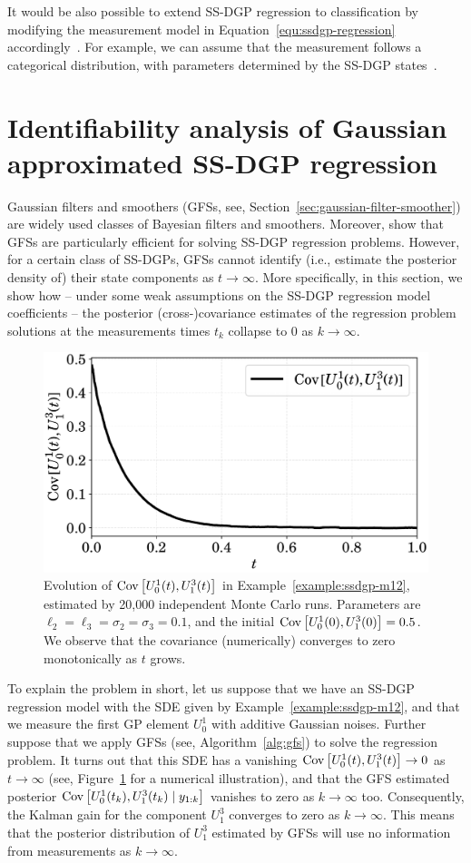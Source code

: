 It would be also possible to extend SS-DGP regression to classification by modifying the measurement model in Equation~\eqref{equ:ssdgp-regression} accordingly~\citep{Neal1998, Carl2006GPML, Garcia2019}. For example, we can assume that the measurement follows a categorical distribution, with parameters determined by the SS-DGP states~\citep{Carl2006GPML}.

\section{Identifiability analysis of Gaussian approximated SS-DGP regression}
\label{sec:identi-problem}
Gaussian filters and smoothers (GFSs, see, Section~\ref{sec:gaussian-filter-smoother}) are widely used classes of Bayesian filters and smoothers. Moreover, \citet{Zhao2020SSDGP} show that GFSs are particularly efficient for solving SS-DGP regression problems. However, for a certain class of SS-DGPs, GFSs cannot identify (i.e., estimate the posterior density of) their state components as $t\to\infty$. More specifically, in this section, we show how -- under some weak assumptions on the SS-DGP regression model coefficients -- the posterior (cross-)covariance estimates of the regression problem solutions at the measurements times $t_k$ collapse to $0$ as $k\to\infty$.

\begin{figure}[t!]
	\centering
	\includegraphics[width=.7\linewidth]{figs/vanishing-cov}
	\caption{Evolution of $\operatorname{Cov} \big[ U^1_0(t), U^3_1(t) \big]$ in Example~\ref{example:ssdgp-m12}, estimated by 20,000 independent Monte Carlo runs. Parameters are $\ell_2=\ell_3=\sigma_2=\sigma_3=0.1$, and the initial $\operatorname{Cov} \big[ U^1_0(0), U^3_1(0) \big]=0.5$. We observe that the covariance (numerically) converges to zero monotonically as $t$ grows.}
	\label{fig:ssdgp-vanishing-cov}
\end{figure}

To explain the problem in short, let us suppose that we have an SS-DGP regression model with the SDE given by Example~\ref{example:ssdgp-m12}, and that we measure the first GP element $U^1_0$ with additive Gaussian noises. Further suppose that we apply GFSs (see, Algorithm~\ref{alg:gfs}) to solve the regression problem. It turns out that this SDE has a vanishing $\operatorname{Cov} \big[ U^1_0(t), U^3_1(t) \big] \to 0$ as $t\to\infty$ (see, Figure~\ref{fig:ssdgp-vanishing-cov} for a numerical illustration), and that the GFS estimated posterior $\operatorname{Cov} \big[ U^1_0(t_k), U^3_1(t_k) {\;|\;} y_{1:k} \big]$ vanishes to zero as $k\to \infty$ too. Consequently, the Kalman gain for the component $U^3_1$ converges to zero as $k\to\infty$. This means that the posterior distribution of $U^3_1$ estimated by GFSs will use no information from measurements as $k\to\infty$.

